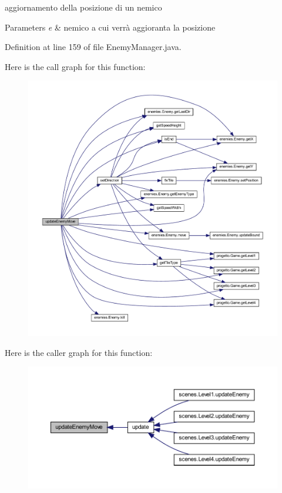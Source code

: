 aggiornamento della posizione di un nemico 


\begin{DoxyParams}{Parameters}
{\em e} & nemico a cui verrà aggioranta la posizione \\
\hline
\end{DoxyParams}


Definition at line 159 of file Enemy\+Manager.\+java.

Here is the call graph for this function\+:
\nopagebreak
\begin{figure}[H]
\begin{center}
\leavevmode
\includegraphics[width=350pt]{classmanagers_1_1_enemy_manager_a8f172cfa5ade4d4f0a6b89cc6bfc4d12_cgraph}
\end{center}
\end{figure}
Here is the caller graph for this function\+:
\nopagebreak
\begin{figure}[H]
\begin{center}
\leavevmode
\includegraphics[width=350pt]{classmanagers_1_1_enemy_manager_a8f172cfa5ade4d4f0a6b89cc6bfc4d12_icgraph}
\end{center}
\end{figure}


